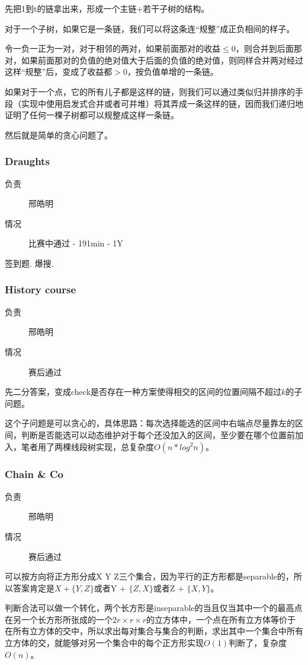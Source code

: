 \documentclass[a4paper, 11pt, nofonts, nocap, fancyhdr]{ctexart}
\newcommand{\problem}[1]{\subsubsection{#1}}
\begin{document}
先把1到t的链拿出来，形成一个主链+若干子树的结构。

对于一个子树，如果它是一条链，我们可以将这条连“规整”成正负相间的样子。

令一负一正为一对，对于相邻的两对，如果前面那对的收益$\leq0$，则合并到后面那对，如果前面那对的负值的绝对值大于后面的负值的绝对值，则同样合并两对经过这样“规整”后，变成了收益都$>0$，按负值单增的一条链。

如果对于一个点，它的所有儿子都是这样的链，则我们可以通过类似归并排序的手段（实现中使用启发式合并或者可并堆）将其弄成一条这样的链，因而我们递归地证明了任何一棵子树都可以规整成这样一条链。

然后就是简单的贪心问题了。

\problem{Draughts}

\begin{description}
\item[负责] 邢皓明
\item[情况] 比赛中通过 - 191min - 1Y
\end{description}

签到题. 爆搜.

\problem{History course}

\begin{description}
\item[负责] 邢皓明
\item[情况] 赛后通过
\end{description}

先二分答案，变成check是否存在一种方案使得相交的区间的位置间隔不超过$k$的子问题。

这个子问题是可以贪心的，具体思路：每次选择能选的区间中右端点尽量靠左的区间，判断是否能选可以动态维护对于每个还没加入的区间，至少要在哪个位置前加入，笔者用了两棵线段树实现，总复杂度$O(n * log^2n)$。

\problem{Chain \& Co}

\begin{description}
\item[负责] 邢皓明
\item[情况] 赛后通过
\end{description}

可以按方向将正方形分成X Y Z三个集合，因为平行的正方形都是separable的，所以答案肯定是$X + \{Y,Z\}$或者Y + $\{Z,X\}$或者Z + $\{X,Y\}$。

判断合法可以做一个转化，两个长方形是inseparable的当且仅当其中一个的最高点在另一个长方形所张成的一个$2r \times r \times r$的立方体中，一个点在所有立方体等价于在所有立方体的交中，所以求出每对集合与集合的判断，求出其中一个集合中所有立方体的交，就能够对另一个集合中的每个正方形实现$O(1)$判断了，复杂度$O(n)$。
\end{document}
